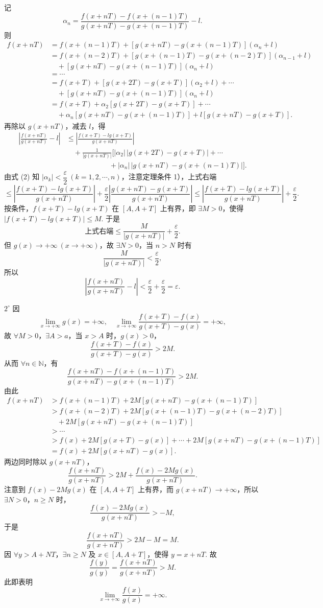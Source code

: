 \documentclass[UTF8,12pt,a4paper,fontset=fandol]{ctexart}
\begin{document}
记
\[
  \alpha_n=
  \frac{f(x+nT)-f(x+(n-1)T)}
  {g(x+nT)-g(x+(n-1)T)}-l. \tag{4}
\]
则
\[
\begin{aligned}
f(x+nT)
&=f(x+(n-1)T)+[g(x+nT)-g(x+(n-1)T)](\alpha_n+l)\\
&=f(x+(n-2)T)+[g(x+(n-1)T)-g(x+(n-2)T)](\alpha_{n-1}+l)\\
&\quad+[g(x+nT)-g(x+(n-1)T)](\alpha_n+l)\\
&=\cdots\\
&=f(x+T)+[g(x+2T)-g(x+T)](\alpha_2+l)+\cdots\\
&\quad+[g(x+nT)-g(x+(n-1)T)](\alpha_n+l)\\
&=f(x+T)+\alpha_2[g(x+2T)-g(x+T)]+\cdots\\
&\quad+\alpha_n[g(x+nT)-g(x+(n-1)T)]
  +l[g(x+nT)-g(x+T)].
\end{aligned}
\]
再除以 $g(x+nT)$，减去 $l$，得
\[
\begin{aligned}
\left|\frac{f(x+nT)}{g(x+nT)}-l\right|
&\le
\left|\frac{f(x+T)-lg(x+T)}{g(x+nT)}\right|\\
&\quad+\frac1{|g(x+nT)|}\bigl[
|\alpha_2|\,|g(x+2T)-g(x+T)|+\cdots\\
&\qquad\qquad\qquad
 +|\alpha_n|\,|g(x+nT)-g(x+(n-1)T)|\bigr].
\end{aligned}
\]
由式 (2) 知 $|\alpha_k|<\dfrac\varepsilon2\ (k=1,2,\cdots,n)$，注意定理条件 1），上式右端
\[
\le
\left|\frac{f(x+T)-lg(x+T)}{g(x+nT)}\right|
+\frac\varepsilon2
\left|\frac{g(x+nT)-g(x+T)}{g(x+nT)}\right|
\le
\left|\frac{f(x+T)-lg(x+T)}{g(x+nT)}\right|+\frac\varepsilon2.
\]
按条件，$f(x+T)-lg(x+T)$ 在 $[A,A+T]$ 上有界，即 $\exists M>0$，使得
$|f(x+T)-lg(x+T)|\le M$. 于是
\[
  \text{上式右端}\le\frac{M}{|g(x+nT)|}+\frac\varepsilon2.
\]
但 $g(x)\to+\infty\ (x\to+\infty)$，故 $\exists N>0$，当 $n>N$ 时有
\[
  \frac{M}{|g(x+nT)|}<\frac\varepsilon2,
\]
所以
\[
  \left|\frac{f(x+nT)}{g(x+nT)}-l\right|
  <\frac\varepsilon2+\frac\varepsilon2=\varepsilon.
\]

$2^\circ$ 因
\[
  \lim_{x\to+\infty}g(x)=+\infty,\quad
  \lim_{x\to+\infty}\frac{f(x+T)-f(x)}{g(x+T)-g(x)}=+\infty,
\]
故 $\forall M>0$，$\exists A>a$，当 $x>A$ 时，$g(x)>0$，
\[
  \frac{f(x+T)-f(x)}{g(x+T)-g(x)}>2M.
\]
从而 $\forall n\in\mathbb N$，有
\[
  \frac{f(x+nT)-f(x+(n-1)T)}
  {g(x+nT)-g(x+(n-1)T)}>2M.
\]
由此
\[
\begin{aligned}
f(x+nT)
&>f(x+(n-1)T)+2M[g(x+nT)-g(x+(n-1)T)]\\
&>f(x+(n-2)T)+2M[g(x+(n-1)T)-g(x+(n-2)T)]\\
&\quad+2M[g(x+nT)-g(x+(n-1)T)]\\
&>\cdots\\
&>f(x)+2M[g(x+T)-g(x)]+\cdots
  +2M[g(x+nT)-g(x+(n-1)T)]\\
&=f(x)+2M[g(x+nT)-g(x)].
\end{aligned}
\]
两边同时除以 $g(x+nT)$，
\[
  \frac{f(x+nT)}{g(x+nT)}
  >2M+\frac{f(x)-2Mg(x)}{g(x+nT)}.
\]
注意到 $f(x)-2Mg(x)$ 在 $[A,A+T]$ 上有界，而 $g(x+nT)\to+\infty$，所以
$\exists N>0$，$n\ge N$ 时，
\[
  \frac{f(x)-2Mg(x)}{g(x+nT)}>-M,
\]
于是
\[
  \frac{f(x+nT)}{g(x+nT)}>2M-M=M.
\]
因 $\forall y>A+NT$，$\exists n\ge N$ 及 $x\in[A,A+T]$，使得 $y=x+nT$. 故
\[
  \frac{f(y)}{g(y)}=\frac{f(x+nT)}{g(x+nT)}>M.
\]
此即表明
\[
  \lim_{x\to+\infty}\frac{f(x)}{g(x)}=+\infty.
\]
\end{document}
